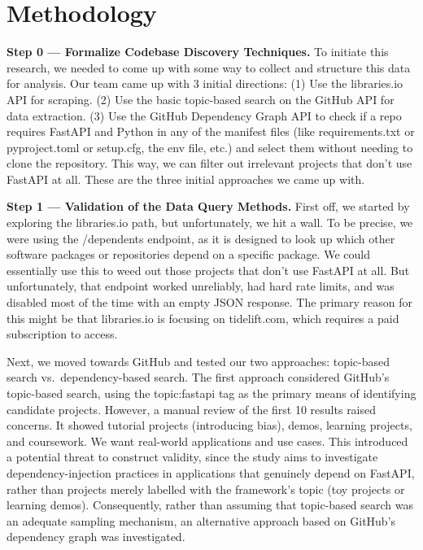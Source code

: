 \section{Methodology}

\textbf{Step 0 --- Formalize Codebase Discovery Techniques.} To initiate this research, we needed to come up with some way to collect and structure this data for analysis. Our team came up with 3 initial directions: (1) Use the libraries.io API for scraping. (2) Use the basic topic-based search on the GitHub API for data extraction. (3) Use the GitHub Dependency Graph API to check if a repo requires FastAPI and Python in any of the manifest files (like requirements.txt or pyproject.toml or setup.cfg, the env file, etc.) and select them without needing to clone the repository. This way, we can filter out irrelevant projects that don't use FastAPI at all. These are the three initial approaches we came up with.

\textbf{Step 1 --- Validation of the Data Query Methods.} First off, we started by exploring the libraries.io path, but unfortunately, we hit a wall. To be precise, we were using the /dependents endpoint, as it is designed to look up which other software packages or repositories depend on a specific package. We could essentially use this to weed out those projects that don't use FastAPI at all. But unfortunately, that endpoint worked unreliably, had hard rate limits, and was disabled most of the time with an empty JSON response. The primary reason for this might be that libraries.io is focusing on tidelift.com, which requires a paid subscription to access.

Next, we moved towards GitHub and tested our two approaches: topic-based search vs.\ dependency-based search. The first approach considered GitHub's topic-based search, using the topic:fastapi tag as the primary means of identifying candidate projects. However, a manual review of the first 10 results raised concerns. It showed tutorial projects (introducing bias), demos, learning projects, and coursework. We want real-world applications and use cases. This introduced a potential threat to construct validity, since the study aims to investigate dependency-injection practices in applications that genuinely depend on FastAPI, rather than projects merely labelled with the framework's topic (toy projects or learning demos). Consequently, rather than assuming that topic-based search was an adequate sampling mechanism, an alternative approach based on GitHub's dependency graph was investigated.

